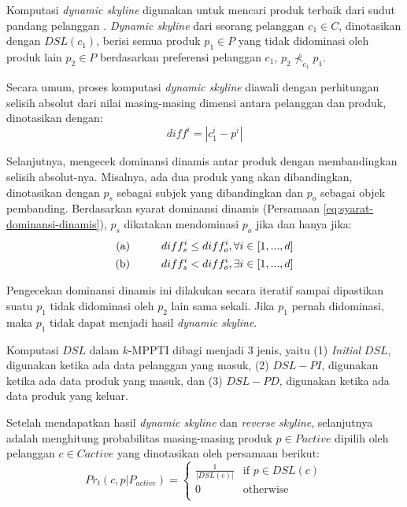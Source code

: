 
Komputasi \textit{dynamic skyline} digunakan untuk mencari produk terbaik dari sudut pandang pelanggan \cite{kmpp}. \textit{Dynamic skyline} \cite{dynamic-skyline} dari seorang pelanggan $c_1 \in C$, dinotasikan dengan $DSL(c_1)$, berisi semua produk $p_1 \in P$ yang tidak didominasi oleh produk lain $p_2 \in P$ berdasarkan preferensi pelanggan $c_1$, $p_2 \nprec_{c_1} p_1$. 

Secara umum, proses komputasi \textit{dynamic skyline} diawali dengan perhitungan selisih absolut dari nilai masing-masing dimensi antara pelanggan dan produk, dinotasikan dengan:
\begin{equation}\label{eq:diff}
diff^i = |c_1^i - p^i|
\end{equation}

Selanjutnya, mengecek dominansi dinamis antar produk dengan membandingkan selisih absolut-nya. Misalnya, ada dua produk yang akan dibandingkan, dinotasikan dengan $p_s$ sebagai subjek yang dibandingkan dan $p_o$ sebagai objek pembanding. Berdasarkan syarat dominansi dinamis (Persamaan \ref{eq:syarat-dominansi-dinamis}), $p_s$ dikatakan mendominasi $p_o$ jika dan hanya jika:
\begin{equation}\label{eq:komputasi-dsl}
\begin{split}
\text{(a)} \hspace*{1cm} diff_s^i \leq diff_o^i, \forall i \in [1, ..., d] \\
\text{(b)} \hspace*{1cm} diff_s^i < diff_o^i, \exists i \in [1, ..., d]
\end{split}
\end{equation}

Pengecekan dominansi dinamis ini dilakukan secara iteratif sampai dipastikan suatu $p_1$ tidak didominasi oleh $p_2$ lain sama sekali. Jika $p_1$ pernah didominasi, maka $p_1$ tidak dapat menjadi hasil \textit{dynamic skyline}.

Komputasi $DSL$ dalam $k$-MPPTI dibagi menjadi 3 jenis, yaitu (1) \textit{Initial} $DSL$, digunakan ketika ada data pelanggan yang masuk, (2) $DSL-PI$, digunakan ketika ada data produk yang masuk, dan (3) $DSL-PD$, digunakan ketika ada data produk yang keluar.



Setelah mendapatkan hasil \textit{dynamic skyline} dan \textit{reverse skyline}, selanjutnya adalah menghitung probabilitas masing-masing produk $p \in P{active}$ dipilih oleh pelanggan $c \in C{active}$ yang dinotasikan oleh persamaan berikut:
\begin{equation}\label{eq:prob-ti}
Pr_t(c, p|P_{active}) = \left\{
						\begin{array}{ll}
						\frac{1}{|DSL(c)|} & \text{if } p \in DSL(c)\\
						0 & \text{otherwise}\\
						\end{array}
						\right.
\end{equation}

